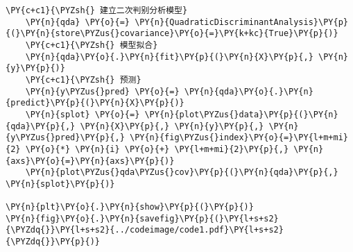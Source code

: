 \begin{Verbatim}[commandchars=\\\{\}]
    \PY{c+c1}{\PYZsh{} 建立二次判别分析模型}
    \PY{n}{qda} \PY{o}{=} \PY{n}{QuadraticDiscriminantAnalysis}\PY{p}{(}\PY{n}{store\PYZus{}covariance}\PY{o}{=}\PY{k+kc}{True}\PY{p}{)}
    \PY{c+c1}{\PYZsh{} 模型拟合}
    \PY{n}{qda}\PY{o}{.}\PY{n}{fit}\PY{p}{(}\PY{n}{X}\PY{p}{,} \PY{n}{y}\PY{p}{)}
    \PY{c+c1}{\PYZsh{} 预测}
    \PY{n}{y\PYZus{}pred} \PY{o}{=} \PY{n}{qda}\PY{o}{.}\PY{n}{predict}\PY{p}{(}\PY{n}{X}\PY{p}{)}
    \PY{n}{splot} \PY{o}{=} \PY{n}{plot\PYZus{}data}\PY{p}{(}\PY{n}{qda}\PY{p}{,} \PY{n}{X}\PY{p}{,} \PY{n}{y}\PY{p}{,} \PY{n}{y\PYZus{}pred}\PY{p}{,} \PY{n}{fig\PYZus{}index}\PY{o}{=}\PY{l+m+mi}{2} \PY{o}{*} \PY{n}{i} \PY{o}{+} \PY{l+m+mi}{2}\PY{p}{,} \PY{n}{axs}\PY{o}{=}\PY{n}{axs}\PY{p}{)}
    \PY{n}{plot\PYZus{}qda\PYZus{}cov}\PY{p}{(}\PY{n}{qda}\PY{p}{,} \PY{n}{splot}\PY{p}{)}

\PY{n}{plt}\PY{o}{.}\PY{n}{show}\PY{p}{(}\PY{p}{)}
\PY{n}{fig}\PY{o}{.}\PY{n}{savefig}\PY{p}{(}\PY{l+s+s2}{\PYZdq{}}\PY{l+s+s2}{../codeimage/code1.pdf}\PY{l+s+s2}{\PYZdq{}}\PY{p}{)}
\end{Verbatim}
